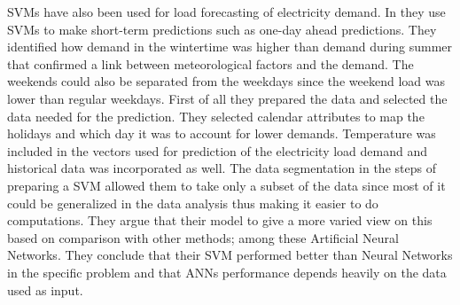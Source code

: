 SVMs have also been used for load forecasting of electricity demand. In \cite{chen2004load} they use SVMs to make short-term predictions such as one-day ahead predictions. They identified how demand in the wintertime was higher than demand during summer that confirmed a link between meteorological factors and the demand. The weekends could also be separated from the weekdays since the weekend load was lower than regular weekdays. First of all they prepared the data and selected the data needed for the prediction. They selected calendar attributes to map the holidays and which day it was to account for lower demands. Temperature was included in the vectors used for prediction of the electricity load demand and historical data was incorporated as well. The data segmentation in the steps of preparing a SVM allowed them to take only a subset of the data since most of it could be generalized in the data analysis thus making it easier to do computations. They argue that their model to give a more varied view on this based on comparison with other methods; among these Artificial Neural Networks. They conclude that their SVM performed better than Neural Networks in the specific problem and that ANNs performance depends heavily on the data used as input.